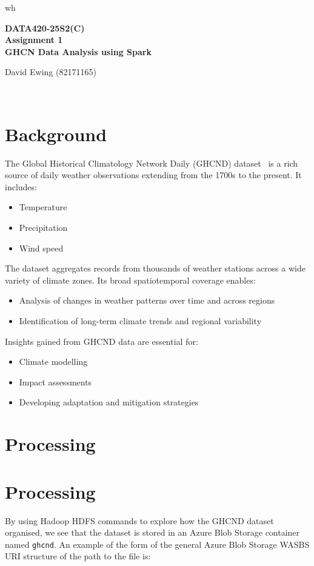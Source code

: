 \documentclass[11pt]{article}
\newcommand{\customtitle}{
    \begin{center}
        \vspace*{3cm}
        
        {\Large\textsf{\textbf{DATA420-25S2(C)}}}\\
        \vspace{0.3cm} 
        {\large\textsf{\textbf{Assignment 1}}}\\
        \vspace{5cm}
        {\Large\textsf{\textbf{GHCN Data Analysis using Spark}}}\\
        \vfill
        {\large David Ewing (82171165)\par}
        \vspace{0.3cm}
        \DTMsetdatestyle{iso}
        {\large\textsf{ \DTMnow}}\\
        
        \vspace{3cm}
    \end{center}
    \thispagestyle{empty}
}
\begin{document}
wh

\renewcommand{\familydefault}{\sfdefault}
\customtitle
\renewcommand{\familydefault}{\sfdefault}
\newpage 



\section{Background}

The Global Historical Climatology Network Daily (GHCND) dataset~\cite{ncei2024} is a rich source of daily weather observations extending from the 1700s to the present. It includes:

\begin{itemize}
    \item Temperature
    \item Precipitation
    \item Wind speed
\end{itemize}

The dataset aggregates records from thousands of weather stations across a wide variety of climate zones. Its broad spatiotemporal coverage enables:

\begin{itemize}
    \item Analysis of changes in weather patterns over time and across regions
    \item Identification of long-term climate trends and regional variability
\end{itemize}

Insights gained from GHCND data are essential for:

\begin{itemize}
    \item Climate modelling
    \item Impact assessments
    \item Developing adaptation and mitigation strategies
\end{itemize}\section{Processing}

\section{Processing} 


By using Hadoop HDFS commands to explore how the GHCND dataset organised, we see that the dataset is stored in an Azure Blob Storage container named \texttt{ghcnd}. An example of the form of the general Azure Blob Storage WASBS URI structure of the path to the file is:
\end{document}
